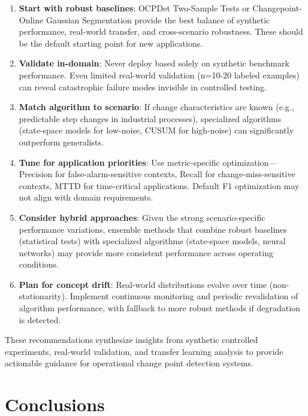 \documentclass[journal,article,submit,pdftex,moreauthors]{Definitions/mdpi}
\begin{document}
\begin{enumerate}
    \item \textbf{Start with robust baselines}: OCPDet Two-Sample Tests or Changepoint-Online Gaussian Segmentation provide the best balance of synthetic performance, real-world transfer, and cross-scenario robustness. These should be the default starting point for new applications.
    
    \item \textbf{Validate in-domain}: Never deploy based solely on synthetic benchmark performance. Even limited real-world validation (n=10-20 labeled examples) can reveal catastrophic failure modes invisible in controlled testing.
    
    \item \textbf{Match algorithm to scenario}: If change characteristics are known (e.g., predictable step changes in industrial processes), specialized algorithms (state-space models for low-noise, CUSUM for high-noise) can significantly outperform generalists.
    
    \item \textbf{Tune for application priorities}: Use metric-specific optimization—Precision for false-alarm-sensitive contexts, Recall for change-miss-sensitive contexts, MTTD for time-critical applications. Default F1 optimization may not align with domain requirements.
    
    \item \textbf{Consider hybrid approaches}: Given the strong scenario-specific performance variations, ensemble methods that combine robust baselines (statistical tests) with specialized algorithms (state-space models, neural networks) may provide more consistent performance across operating conditions.
    
    \item \textbf{Plan for concept drift}: Real-world distributions evolve over time (non-stationarity). Implement continuous monitoring and periodic revalidation of algorithm performance, with fallback to more robust methods if degradation is detected.
\end{enumerate}

These recommendations synthesize insights from synthetic controlled experiments, real-world validation, and transfer learning analysis to provide actionable guidance for operational change point detection systems.


\section{Conclusions}
\end{document}
